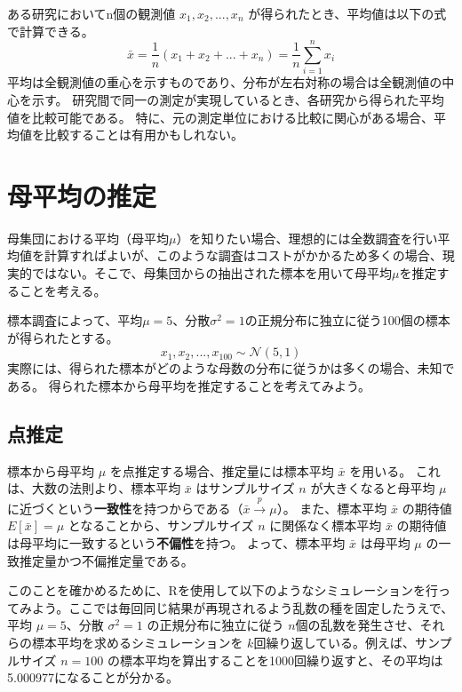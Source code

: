 \documentclass[
  ja=standard, xelatex, base=12pt]{bxjsreport}
\begin{document}
ある研究においてn個の観測値 \(x_1, x_2, ..., x_n\) が得られたとき、平均値は以下の式で計算できる。 \[
\bar{x}=\frac{1}{n}(x_1+x_2+...+x_n)=\frac{1}{n}\sum_{i=1}^{n}x_i
\] 平均は全観測値の重心を示すものであり、分布が左右対称の場合は全観測値の中心を示す。 研究間で同一の測定が実現しているとき、各研究から得られた平均値を比較可能である。 特に、元の測定単位における比較に関心がある場合、平均値を比較することは有用かもしれない。

\hypertarget{ux6bcdux5e73ux5747ux306eux63a8ux5b9a}{%
\section{母平均の推定}\label{ux6bcdux5e73ux5747ux306eux63a8ux5b9a}}

母集団における平均（母平均\(\mu\)）を知りたい場合、理想的には全数調査を行い平均値を計算すればよいが、このような調査はコストがかかるため多くの場合、現実的ではない。そこで、母集団からの抽出された標本を用いて母平均\(\mu\)を推定することを考える。

標本調査によって、平均\(\mu=5\)、分散\(\sigma^2=1\)の正規分布に独立に従う100個の標本が得られたとする。\[
x_1, x_2, ..., x_{100} \sim \mathcal{N}(5, 1)
\] 実際には、得られた標本がどのような母数の分布に従うかは多くの場合、未知である。 得られた標本から母平均を推定することを考えてみよう。

\hypertarget{ux70b9ux63a8ux5b9a}{%
\subsection{点推定}\label{ux70b9ux63a8ux5b9a}}

標本から母平均 \(\mu\) を点推定する場合、推定量には標本平均 \(\bar{x}\) を用いる。 これは、大数の法則より、標本平均 \(\bar{x}\) はサンプルサイズ \(n\) が大きくなると母平均 \(\mu\) に近づくという\textbf{一致性}を持つからである（\(\bar{x}\stackrel{p}{\longrightarrow}\mu\)）。 また、標本平均 \(\bar{x}\) の期待値 \(E[\bar{x}]=\mu\) となることから、サンプルサイズ \(n\) に関係なく標本平均 \(\bar{x}\) の期待値は母平均に一致するという\textbf{不偏性}を持つ。 よって、標本平均 \(\bar{x}\) は母平均 \(\mu\) の一致推定量かつ不偏推定量である。

このことを確かめるために、Rを使用して以下のようなシミュレーションを行ってみよう。ここでは毎回同じ結果が再現されるよう乱数の種を固定したうえで、平均 \(\mu=5\)、分散 \(\sigma^2=1\) の正規分布に独立に従う \(n\)個の乱数を発生させ、それらの標本平均を求めるシミュレーションを \(k\)回繰り返している。例えば、サンプルサイズ \(n=100\) の標本平均を算出することを1000回繰り返すと、その平均は5.000977になることが分かる。
\end{document}

